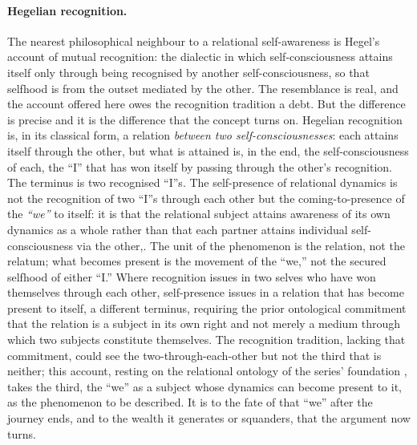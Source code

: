 \paragraph{Hegelian recognition.}
The nearest philosophical neighbour to a relational self-awareness is Hegel's account of mutual recognition: the dialectic in which self-consciousness attains itself only through being recognised by another self-consciousness, so that selfhood is from the outset mediated by the other. The resemblance is real, and the account offered here owes the recognition tradition a debt. But the difference is precise and it is the difference that the concept turns on. Hegelian recognition is, in its classical form, a relation \emph{between two self-consciousnesses}: each attains itself through the other, but what is attained is, in the end, the self-consciousness of each, the ``I'' that has won itself by passing through the other's recognition. The terminus is two recognised ``I''s. The self-presence of relational dynamics is not the recognition of two ``I''s through each other but the coming-to-presence of the \emph{``we''} to itself: it is that the relational subject attains awareness of its own dynamics as a whole rather than that each partner attains individual self-consciousness via the other,. The unit of the phenomenon is the relation, not the relatum; what becomes present is the movement of the ``we,'' not the secured selfhood of either ``I.'' Where recognition issues in two selves who have won themselves through each other, self-presence issues in a relation that has become present to itself, a different terminus, requiring the prior ontological commitment that the relation is a subject in its own right and not merely a medium through which two subjects constitute themselves. The recognition tradition, lacking that commitment, could see the two-through-each-other but not the third that is neither; this account, resting on the relational ontology of the series' foundation \parencite{wan2024grb}, takes the third, the ``we'' as a subject whose dynamics can become present to it, as the phenomenon to be described. It is to the fate of that ``we'' after the journey ends, and to the wealth it generates or squanders, that the argument now turns.
